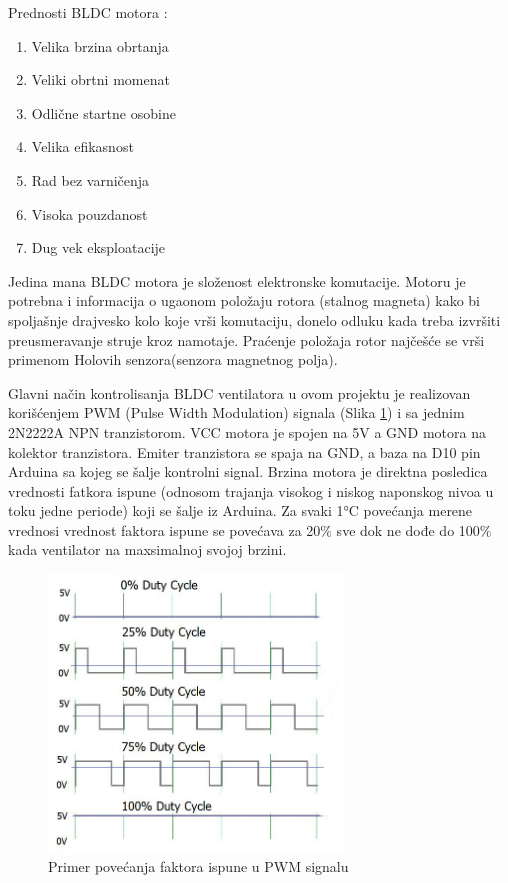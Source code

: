 \documentclass[a4paper, 12pt]{article}
\begin{document}
\vspace{10pt}

Prednosti BLDC motora : 
\begin{enumerate}
	\item Velika brzina obrtanja 
	\item Veliki obrtni momenat 
	\item Odlične startne osobine 
	\item Velika efikasnost 
	\item Rad bez varničenja  
	\item Visoka pouzdanost  
	\item Dug vek eksploatacije
\end{enumerate}
\endgroup
\pagebreak
Jedina mana BLDC motora je složenost elektronske komutacije. Motoru je potrebna i informacija o ugaonom položaju rotora (stalnog magneta) kako bi spoljašnje drajvesko kolo koje vrši komutaciju, donelo odluku kada treba izvršiti preusmeravanje struje kroz namotaje. Praćenje položaja rotor najčešće se vrši primenom Holovih senzora(senzora magnetnog polja).

\vspace{10pt}

Glavni način kontrolisanja BLDC ventilatora u ovom projektu je realizovan korišćenjem  PWM (Pulse Width Modulation) signala (Slika \ref{fig:pwm}) i sa jednim 2N2222A NPN tranzistorom. VCC motora je spojen na 5V a GND motora na kolektor tranzistora. Emiter tranzistora se spaja na GND, a baza na D10 pin Arduina sa kojeg se šalje kontrolni signal. Brzina motora je direktna posledica vrednosti fatkora ispune (odnosom trajanja visokog i niskog naponskog nivoa u toku jedne periode) koji se šalje iz Arduina. Za svaki 1°C povećanja merene vrednosi vrednost faktora ispune se povećava za 20\% sve dok ne dođe do 100\% kada ventilator na maxsimalnoj svojoj brzini. 

\vspace{10pt}

\begin{figure}[H]
\centering
	\includegraphics[width=0.7\textwidth]{images/pwm}
	\caption{Primer povećanja faktora ispune u PWM signalu} \label{fig:pwm}
\end{figure}
\pagebreak
\end{document}
